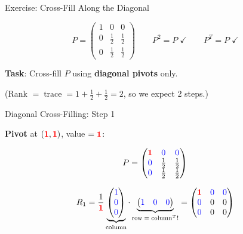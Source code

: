 \documentclass[10pt]{beamer}
\theoremstyle{definition}
\newcommand{\x}[1]{\alert{\textbf{#1}}}
\newcommand{\pvt}[1]{{\color{red}\mathbf{#1}}}       %
\newcommand{\crs}[1]{{\color{blue}#1}}                %
\begin{document}
\begin{frame}{Exercise: Cross-Fill Along the Diagonal}

$$P = \begin{pmatrix} 1 & 0 & 0 \\ 0 & \frac{1}{2} & \frac{1}{2} \\ 0 & \frac{1}{2} & \frac{1}{2} \end{pmatrix} \qquad P^2 = P \;\checkmark \qquad P^T = P \;\checkmark$$

\vspace{1em}

\x{Task}: Cross-fill $P$ using \x{diagonal pivots} only.

\vspace{0.5em}

(Rank $= \operatorname{trace} = 1 + \frac{1}{2} + \frac{1}{2} = 2$, so we expect 2 steps.)

\end{frame}

\begin{frame}{Diagonal Cross-Filling: Step 1}

\x{Pivot} at $(\pvt{1},\pvt{1})$, value $= \pvt{1}$:

$$P = \begin{pmatrix} \pvt{1} & \crs{0} & \crs{0} \\ \crs{0} & \frac{1}{2} & \frac{1}{2} \\ \crs{0} & \frac{1}{2} & \frac{1}{2} \end{pmatrix}$$

$$R_1 = \frac{1}{\pvt{1}} \underbrace{\begin{pmatrix} \crs{1} \\ \crs{0} \\ \crs{0} \end{pmatrix}}_{\text{column}} \cdot \underbrace{\begin{pmatrix} \crs{1} & \crs{0} & \crs{0} \end{pmatrix}}_{\text{row} \;=\; \text{column}^T!} = \begin{pmatrix} \pvt{1} & \crs{0} & \crs{0} \\ \crs{0} & 0 & 0 \\ \crs{0} & 0 & 0 \end{pmatrix}$$

\end{frame}
\end{document}
